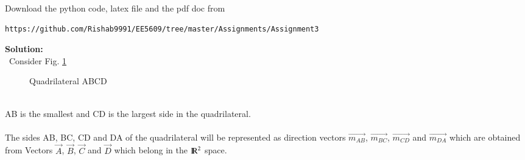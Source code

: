 \documentclass[journal,12pt,twocolumn]{IEEEtran}
\begin{document}
%
Download the python code, latex file and the pdf doc from 
\begin{lstlisting}
https://github.com/Rishab9991/EE5609/tree/master/Assignments/Assignment3
\end{lstlisting}
\textbf{Solution:}
\\\ Consider Fig. \ref{Fig:1}
\begin{figure}[!ht]
    \centering
     \caption{Quadrilateral ABCD}
     \label{Fig:1}
\end{figure}
\\
AB is the smallest and CD is the largest side in the quadrilateral.\\\\
The sides AB, BC, CD and DA of the quadrilateral will be represented as direction vectors $\vec{m_{AB}}$, $\vec{m_{BC}}$, $\vec{m_{CD}}$ and $\vec{m_{DA}}$ which are obtained from Vectors $\vec{A}$, $\vec{B}$, $\vec{C}$ and $\vec{D}$ which belong in the ${\rm I\!R}^2$ space. 
\end{document}
